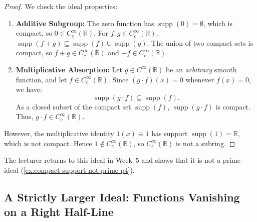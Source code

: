 \begin{content}
\begin{center}
\end{center}


\begin{proof}
We check the ideal properties:
\begin{enumerate}[label=\textbf{(\arabic*)}]
    \item \textbf{Additive Subgroup:} The zero function has $\operatorname{supp}(0) = \emptyset$, which is compact, so $0 \in C_c^\infty(\mathbb{R})$. For $f, g \in C_c^\infty(\mathbb{R})$, $\operatorname{supp}(f + g) \subseteq \operatorname{supp}(f) \cup \operatorname{supp}(g)$. The union of two compact sets is compact, so $f + g \in C_c^\infty(\mathbb{R})$ and $-f \in C_c^\infty(\mathbb{R})$.
    \item \textbf{Multiplicative Absorption:} Let $g \in C^\infty(\mathbb{R})$ be an \emph{arbitrary} smooth function, and let $f \in C_c^\infty(\mathbb{R})$. Since $(g \cdot f)(x) = 0$ whenever $f(x) = 0$, we have:
    \[
    \operatorname{supp}(g \cdot f) \subseteq \operatorname{supp}(f).
    \]
    As a closed subset of the compact set $\operatorname{supp}(f)$, $\operatorname{supp}(g \cdot f)$ is compact. Thus, $g \cdot f \in C_c^\infty(\mathbb{R})$.
\end{enumerate}
However, the multiplicative identity $1(x) \equiv 1$ has support $\operatorname{supp}(1) = \mathbb{R}$, which is not compact. Hence $1 \notin C_c^\infty(\mathbb{R})$, so $C_c^\infty(\mathbb{R})$ is not a subring.
\end{proof}

The lecturer returns to this ideal in Week~5 and shows that it is not a prime ideal (\cref{ex:compact-support-not-prime-p4}).
\end{content}

\subsection{A Strictly Larger Ideal: Functions Vanishing on a Right Half-Line}

